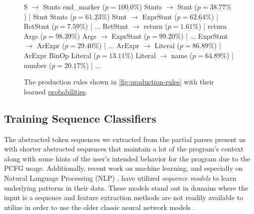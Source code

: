 \begin{figure}[t]
\begin{rules}
S        $\rightarrow$ Stmts end_marker ($p = \underline{100.0\%}$)
Stmts    $\rightarrow$ Stmt \n ($p = \underline{38.77\%}$) | Stmt \n Stmts ($p = \underline{61.23\%}$)
Stmt     $\rightarrow$ ExprStmt ($p = \underline{62.64\%}$) | RetStmt ($p = \underline{ 7.59\%}$) | ...
RetStmt  $\rightarrow$ return ($p = \underline{ 1.61\%}$) | return Args ($p = \underline{98.39\%}$)
Args     $\rightarrow$ ExprStmt ($p = \underline{99.20\%}$) | ...
ExprStmt $\rightarrow$ ArExpr ($p = \underline{29.40\%}$) | ...
ArExpr   $\rightarrow$ Literal ($p = \underline{86.89\%}$) | ArExpr BinOp Literal ($p = \underline{13.11\%}$)
Literal  $\rightarrow$ name ($p = \underline{64.89\%}$) | number ($p = \underline{20.17\%}$) | ...
\end{rules}
\caption{The production rules shown in \autoref{fig:production-rules} with
their learned \underline{probabilities}.}
\label{fig:weighted-production-rules}
\end{figure}

\subsection{Training Sequence Classifiers}
\label{sec:overview:train}
The abstracted token sequences we extracted from the partial parses present us
with shorter abstracted sequences that maintain a lot of the program's context
along with some hints of the user's intended behavior for the program due to the
PCFG usage. Additionally, recent work on machine learning, and especially on
Natural Language Processing (NLP) \citep{Sutskever_2014, Hardalov_2018}, have
utilized \emph{sequence models} to learn underlying patterns in their data.
These models stand out in domains where the input is a sequence and feature
extraction methods are not readily available to utilize in order to use the
older classic neural network models \citep{Sutskever_2014}.

